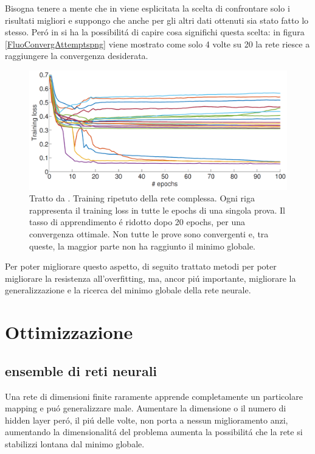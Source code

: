 \documentclass[a4paper,12pt]{report}
\begin{document}
 Bisogna tenere a mente che in \cite{guberman2016complex} viene esplicitata la scelta di confrontare solo i risultati migliori e suppongo che anche per gli altri dati ottenuti sia stato fatto lo stesso.
 Per\'o in \cite{guberman2016complex} si ha la possibilit\'a di capire cosa significhi questa scelta: in figura \ref{FluoConvergAttemptspng} viene mostrato come solo 4 volte su 20 la rete riesce a raggiungere la convergenza desiderata.
 \begin{figure}[h]
  \centering
  \includegraphics[scale=0.4]{FluoConvergAttempts.png}
  \caption{Tratto da \cite{guberman2016complex}. Training ripetuto della rete complessa. Ogni riga rappresenta il training loss in tutte le epochs di una singola prova. Il tasso di apprendimento \'e ridotto dopo 20 epochs, per una convergenza ottimale. Non tutte le prove sono convergenti e, tra queste, la maggior parte non ha raggiunto il minimo globale.}
 \end{figure}

 
 Per poter migliorare questo aspetto, di seguito trattato metodi per poter migliorare la resistenza all'overfitting, ma, ancor pi\'u importante, migliorare la generalizzazione e la ricerca del minimo globale della rete neurale.


 \chapter*{Ottimizzazione}
 \section{ensemble di reti neurali}
 Una rete di dimensioni finite raramente apprende completamente un particolare mapping e pu\'o generalizzare male. 
 Aumentare la dimensione o il numero di hidden layer per\'o, il pi\'u delle volte, non porta a nessun miglioramento \cite{soulie1987evaluation} anzi, aumentando la dimensionalit\'a del problema aumenta la possibilit\'a che la rete si stabilizzi lontana dal minimo globale. 
 
\end{document}
